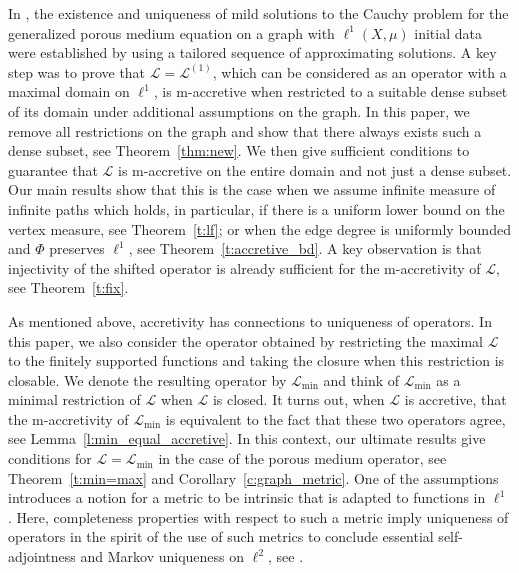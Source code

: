\documentclass[letterpaper]{article}
\theoremstyle{definition}
\theoremstyle{named}
\numberwithin{equation}{section}
\newcommand{\Deltaphi}{\mathcal{L}}
\newcommand{\ellone}{\ell^1(X,\mu)}
\newcommand{\deltaphim}{\mathcal{L}_{\min}}
\begin{document}
In \cite{bianchi2022generalized}, the existence and uniqueness of mild solutions to the 
Cauchy problem for the generalized porous medium equation
on a graph with $\ellone$ initial data were established by using a tailored sequence of approximating solutions. 
A key step was to prove that $\Deltaphi=\Deltaphi^{(1)}$, 
which can
be considered as an operator with a maximal domain on $\ell^1$,
is m-accretive when restricted to a suitable dense subset 
of its domain under additional assumptions on the graph. In this paper, 
we remove all restrictions on the graph and show that there always exists
such a dense subset, see Theorem~\ref{thm:new}.
We then give sufficient conditions 
to guarantee that $\Deltaphi$ is m-accretive on 
the entire domain and not just 
a dense subset. Our main results show that this is the case
when we assume infinite measure 
of infinite paths which holds, in particular, 
if there is a uniform lower bound on the vertex measure, see Theorem~\ref{t:lf};
or when
 the edge degree is uniformly bounded and $\Phi$ preserves $\ell^1$,
see Theorem~\ref{t:accretive_bd}.
A key observation is that injectivity
of the shifted operator is already sufficient for the m-accretivity
of $\Deltaphi$, see Theorem~\ref{t:fix}.

As mentioned above, accretivity has connections to uniqueness of 
operators. In this paper, we also consider the operator obtained by
restricting the maximal $\Deltaphi$ to the finitely supported 
functions and taking the closure when this restriction is closable. 
We denote the resulting operator by $\deltaphim$ and think of $\deltaphim$
as a minimal restriction of $\Deltaphi$ when $\Deltaphi$ is closed.
It turns out, when $\Deltaphi$ is accretive, that the m-accretivity of
$\deltaphim$ is equivalent to the fact that these two operators
agree, see Lemma~\ref{l:min_equal_accretive}.
In this context, our ultimate results give conditions for $\Deltaphi = \deltaphim$ in the case
of the porous medium operator, see Theorem~\ref{t:min=max} and Corollary~\ref{c:graph_metric}.
One of the assumptions introduces a notion for a metric to be
intrinsic that is adapted to functions in $\ell^1$. 
Here, completeness properties with respect to such a metric imply 
uniqueness of operators in the spirit of the use of such metrics
to conclude essential self-adjointness and Markov uniqueness
on $\ell^2$, see \cite{HK14, HKMW13, keller2021graphs, Sch20}.
\end{document}
